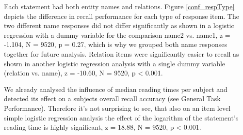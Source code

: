 \documentclass[a4paper,man,natbib,floatsintext,import]{apa6}
\begin{document}
Each statement had both entity names and relations. Figure \ref{conf_respType} depicts the difference in recall performance for each type of response item. The two different name responses did not differ significantly as shown in a logistic regression with a dummy variable for the comparison name2 vs. name1, z = -1.104, N = 9520, p = 0.27, which is why we grouped both name responses together for future analysis. Relation items were significantly easier to recall as shown in another logistic regression analysis with a single dummy variable (relation vs. name), z = -10.60, N = 9520, p < 0.001.

We already analysed the influence of median reading times per subject and detected its effect on a subjects overall recall accuracy (see General Task Performance). Therefore it's not surprising to see, that also on an item level simple logistic regression analysis the effect of the logarithm of the statement's reading time is highly significant, z = 18.88, N = 9520, p < 0.001.
\end{document}
